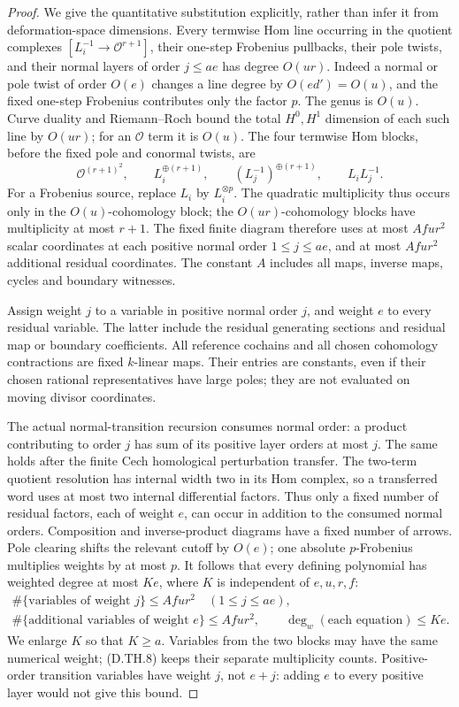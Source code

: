 \begin{proof}
We give the quantitative substitution explicitly, rather
than infer it from deformation-space dimensions. Every
termwise Hom line occurring in the quotient complexes
$[L_i^{-1}\to\mathcal O^{r+1}]$, their one-step Frobenius
pullbacks, their pole twists, and their normal layers of
order $j\leq ae$ has degree $O(ur)$. Indeed a normal
or pole twist of order $O(e)$ changes a line degree by
$O(e d')=O(u)$, and the fixed one-step Frobenius contributes
only the factor $p$. The genus is $O(u)$. Curve duality
and Riemann--Roch bound the total $H^0,H^1$ dimension of
each such line by $O(ur)$; for an $\mathcal O$ term
it is $O(u)$. The four termwise Hom blocks, before the
fixed pole and conormal twists, are
\[
 \mathcal O^{(r+1)^2},\qquad L_i^{\oplus(r+1)},\qquad
 (L_j^{-1})^{\oplus(r+1)},\qquad L_iL_j^{-1}.
\]
For a Frobenius source, replace $L_i$ by $L_i^{\otimes p}$.
The quadratic multiplicity thus occurs only in the
$O(u)$-cohomology block; the $O(ur)$-cohomology blocks
have multiplicity at most $r+1$. The fixed finite diagram therefore
uses at most $Afur^2$ scalar coordinates at each positive
normal order $1\leq j\leq ae$, and at most $Afur^2$
additional residual coordinates. The constant $A$ includes
all maps, inverse maps, cycles and boundary witnesses.

Assign weight $j$ to a variable in positive normal order
$j$, and weight $e$ to every residual variable. The latter
include the residual generating sections and residual
map or boundary coefficients. All reference cochains and
all chosen cohomology contractions are fixed $k$-linear
maps. Their entries are constants, even if their chosen
rational representatives have large poles; they are not
evaluated on moving divisor coordinates.

The actual normal-transition recursion consumes normal
order: a product contributing to order $j$ has sum of its
positive layer orders at most $j$. The same holds after
the finite Cech homological perturbation transfer. The
two-term quotient resolution has internal width two in
its Hom complex, so a transferred word uses at most two
internal differential factors. Thus only a fixed number
of residual factors, each of weight $e$, can occur in
addition to the consumed normal orders. Composition and
inverse-product diagrams have a fixed number of arrows.
Pole clearing shifts the relevant cutoff by $O(e)$;
one absolute $p$-Frobenius multiplies weights by at most
$p$. It follows that every defining polynomial has
weighted degree at most $Ke$, where $K$ is independent
of $e,u,r,f$:
\[
 \begin{gathered}
  \#\{\text{variables of weight }j\}\leq Afur^2
           \quad(1\leq j\leq ae),\\
  \#\{\text{additional variables of weight }e\}
           \leq Afur^2,
  \qquad \deg_w(\text{each equation})\leq Ke.
 \end{gathered}                                         \tag{D.TH.8}
\]
We enlarge $K$ so that $K\geq a$. Variables from the two
blocks may have the same numerical weight; (D.TH.8)
keeps their separate multiplicity counts. Positive-order
transition variables have weight $j$, not $e+j$: adding
$e$ to every positive layer would not give this bound.


\end{proof}
